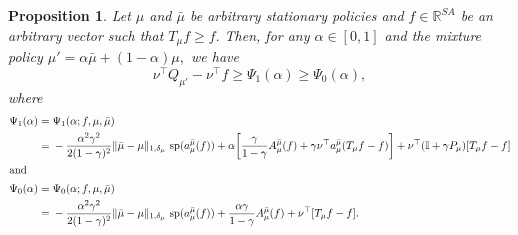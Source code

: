 \documentclass[twoside]{article}
\theoremstyle{plain}
\newtheorem{proposition}[theorem]{Proposition}
\theoremstyle{definition}
\theoremstyle{remark}
\renewcommand{\sp}{\mathrm{sp}}
\newcommand{\tr}{\top}
\newcommand{\bI}{\mathbb{I}}
\newcommand{\bR}{\mathbb{R}}
\newcommand{\mup}{\mu'}
\newcommand{\mub}{\bar{\mu}}
\begin{document}
\begin{proposition}
\label{prop:perf.Diff.Quad.Bd}
    Let $\mu$ and $\mub$ be arbitrary stationary policies and $f \in \bR^{SA}$ be an arbitrary vector such that $T_{\mu} f \geq f.$  Then, for any $\alpha \in [0, 1]$ and the mixture policy $\mup = \alpha \mub + (1 - \alpha) \mu,$ we have
    \begin{equation}
        \nu^\tr  Q_{\mup}  - \nu^\tr f \geq \Psi_1(\alpha)  \geq \Psi_0(\alpha),
    \end{equation}
    where 
    \begin{align}
        \Psi_1(\alpha) = {} & \Psi_1(\alpha; f,  \mu, \mub) \nonumber \\
        = {} & - \frac{ \alpha^2 \gamma^2}{2  (1 - \gamma)^2} \|\mub - \mu\|_{1, \delta_\mu}\ \sp(a_\mu^{\mub} (f))  + \alpha\! \left[\frac{\gamma}{1 - \gamma} A_{\mu}^{\mub} (f) + \gamma \nu^\tr a_{\mu}^{\mub}(T_{\mu}f - f) \right] +  \nu^\tr(\bI + \gamma P_{\mu})[T_{\mu}f - f]  \label{e:perf.Diff.Quad.Bd.H.equals.1} \\
        \intertext{and}
        \Psi_0 (\alpha) = {} & \Psi_0(\alpha; f, \mu, \mub) \nonumber \\
        = {} & - \frac{ \alpha^2 \gamma^2}{2  (1 - \gamma)^2} \|\mub - \mu\|_{1, \delta_\mu}\ \sp(a_\mu^{\mub} (f))  + \frac{ \alpha\gamma}{1 - \gamma} A_{\mu}^{\mub} (f) + \nu^\tr [T_{\mu}f - f]. \label{e:perf.Diff.Quad.Bd}
    \end{align}

    

\end{proposition}
\end{document}
